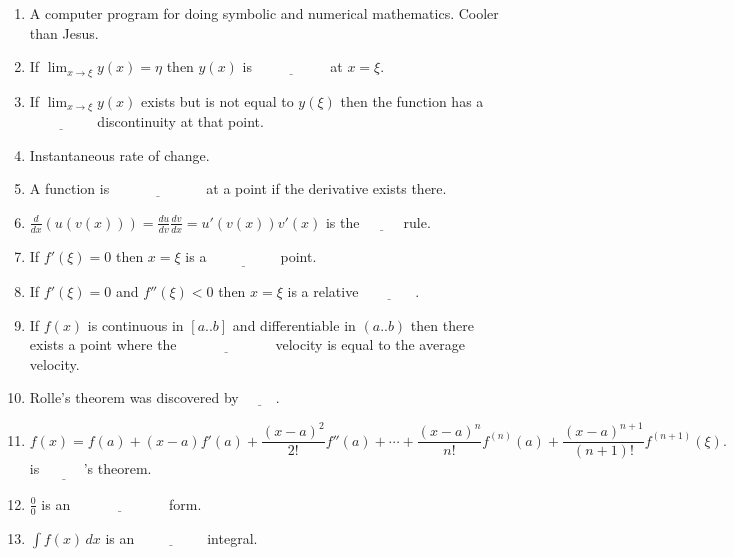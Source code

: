 \documentclass{letter}
\begin{document}
\begin{enumerate}

\item
A computer program for doing symbolic and numerical mathematics.
Cooler than Jesus.

\item
If $\lim_{x \rightarrow \xi} y(x) = \eta$ then $y(x)$ is 
$\underline{\phantom{continuous}}$ at $x = \xi$.

\item
If $\lim_{x \rightarrow \xi} y(x)$ exists but is not equal to $y(\xi)$ then
the function has a $\underline{\phantom{removable}}$ discontinuity at that
point.

\item
Instantaneous rate of change.

\item
A function is $\underline{\phantom{differentiable}}$ at a point if the 
derivative exists there.

\item
$\frac{d}{d x}(u(v(x))) = \frac{d u}{d v} \frac{d v}{d x} = u'(v(x)) v'(x)$
is the $\underline{\phantom{chain}}$ rule.

\item
If $f'(\xi) = 0$ then $x = \xi$ is a $\underline{\phantom{stationary}}$
point.

\item
If $f'(\xi) = 0$ and $f''(\xi) < 0$ then $x = \xi$ is a relative
$\underline{\phantom{maxima}}$.

\item
If $f(x)$ is continuous in $[a..b]$ and differentiable in $(a..b)$ then
there exists a point where the $\underline{\phantom{instantaneous}}$
velocity is equal to the average velocity.

\item
Rolle's theorem was discovered by $\underline{\phantom{Rolle}}$.

\item
\[
f(x) = f(a) + (x-a) f'(a) + \frac{(x-a)^2}{2!} f''(a) + \cdots +
        \frac{(x-a)^n}{n!} f^{(n)}(a)
        + \frac{(x-a)^{n+1}}{(n+1)!} f^{(n+1)}(\xi).
\]
is $\underline{\phantom{Taylor}}$'s theorem.

\item
$\frac{0}{0}$ is an $\underline{\phantom{indeterminate}}$ form.

\item
$\int f(x)\,d x$ is an $\underline{\phantom{indefinite}}$ integral.


\end{enumerate}
\end{document}
